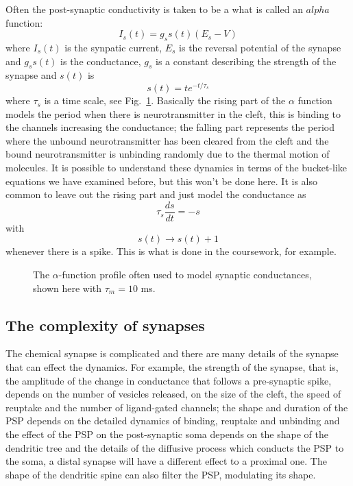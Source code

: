 \documentclass[11pt,a4paper]{scrartcl}
\begin{document}
Often the post-synaptic conductivity is taken to be a what is called an
$alpha$ function:
\begin{equation}
I_s(t)=g_ss(t)(E_s-V)
\end{equation}
where $I_s(t)$ is the synpatic current, $E_s$ is the reversal
potential of the synapse and $g_ss(t)$ is the conductance, $g_s$ is a
constant describing the strength of the synapse and $s(t)$ is 
\begin{equation}
s(t)=te^{-t/\tau_s}
\end{equation}
where $\tau_s$ is a time scale, see Fig.~\ref{fig:alpha}. Basically
the rising part of the $\alpha$ function models the period when there
is neurotransmitter in the cleft, this is binding to the channels
increasing the conductance; the falling part represents the period
where the unbound neurotransmitter has been cleared from the cleft and
the bound neurotransmitter is unbinding randomly due to the thermal
motion of molecules. It is possible to understand these dynamics in
terms of the bucket-like equations we have examined before, but this
won't be done here. It is also common to leave out the rising part and
just model the conductance as
\begin{equation}
\tau_s\frac{ds}{dt}=-s
\end{equation}
with
\begin{equation}
s(t)\rightarrow s(t)+1
\end{equation}
whenever there is a spike. This is what is done in the coursework, for
example.

\begin{figure}
\begin{center}

\end{center}
\caption{The $\alpha$-function profile often used to model synaptic
  conductances, shown here with $\tau_m=10$ ms.\label{fig:alpha}}
\end{figure}

\subsection*{The complexity of synapses}

The chemical synapse is complicated and there are many details of the
synapse that can effect the dynamics. For example, the strength of the
synapse, that is, the amplitude of the change in conductance that
follows a pre-synaptic spike, depends on the number of vesicles
released, on the size of the cleft, the speed of reuptake and the
number of ligand-gated channels; the shape and duration of the PSP
depends on the detailed dynamics of binding, reuptake and unbinding
and the effect of the PSP on the post-synaptic soma depends on the
shape of the dendritic tree and the details of the diffusive process
which conducts the PSP to the soma, a distal synapse will have a
different effect to a proximal one. The shape of the dendritic spine
can also filter the PSP, modulating its shape.
\end{document}
